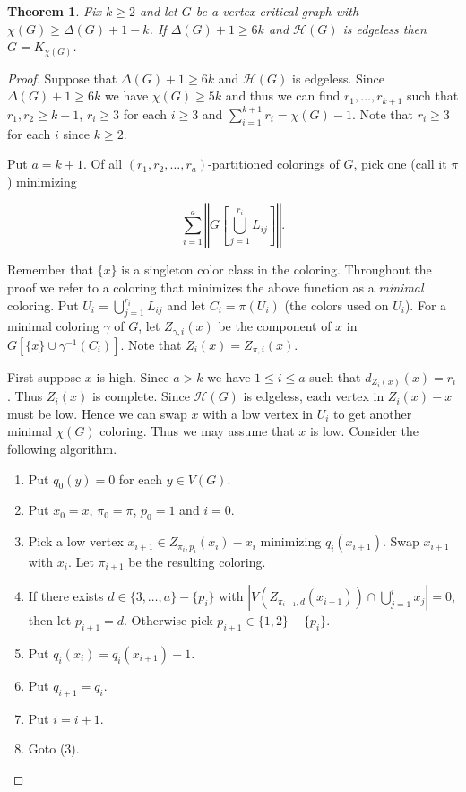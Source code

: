 \documentclass[12pt]{amsart}
\theoremstyle{plain}
\newtheorem{thm}{Theorem}
\theoremstyle{definition}
\theoremstyle{remark}
\newcommand{\size}[1]{\left\Vert#1\right\Vert}
\begin{document}
\begin{thm}\label{TheoremP}
Fix $k \geq 2$ and let $G$ be a vertex critical graph with $\chi(G) \geq \Delta(G) + 1 - k$.  If $\Delta(G) + 1 \geq 6k$ and $\mathcal{H}(G)$ is edgeless then $G = K_{\chi(G)}$.
\end{thm}
\begin{proof}
Suppose that $\Delta(G) + 1 \geq 6k$ and $\mathcal{H}(G)$ is edgeless. Since $\Delta(G) + 1 \geq 6k$ we have $\chi(G) \geq 5k$ and thus we can find $r_1, \ldots, r_{k+1}$ such that $r_1, r_2 \geq k + 1$, $r_i \geq 3$ for each $i \geq 3$ and $\sum_{i = 1}^{k+1} r_i = \chi(G) - 1$.  Note that $r_i \geq 3$ for each $i$ since $k \geq 2$.

Put $a = k+1$. Of all $(r_1, r_2, \ldots, r_a)$-partitioned colorings of $G$, pick one (call it $\pi$) minimizing

\[\sum_{i = 1}^a \size{G\left[\bigcup_{j = 1}^{r_i} L_{ij}\right]}.\]

Remember that $\{x\}$ is a singleton color class in the coloring. Throughout the proof we refer to a coloring that minimizes the above function as a \emph{minimal} coloring. Put $U_i = \bigcup_{j = 1}^{r_i} L_{ij}$ and let $C_i = \pi(U_i)$ (the colors used on $U_i$).  For a minimal coloring $\gamma$ of $G$, let $Z_{\gamma, i}(x)$ be the component of $x$ in $G[\{x\} \cup \gamma^{-1}(C_i)]$.  Note that $Z_i(x) = Z_{\pi, i}(x)$.

First suppose $x$ is high. Since $a > k$ we have $1 \leq i \leq a$ such that $d_{Z_i(x)}(x) = r_i$.  Thus $Z_i(x)$ is complete.  Since $\mathcal{H}(G)$ is edgeless, each vertex in $Z_i(x) - x$ must be low.  Hence we can swap $x$ with a low vertex in $U_i$ to get another minimal $\chi(G)$ coloring. Thus we may assume that $x$ is low.  Consider the following algorithm.
\begin{enumerate}
\item Put $q_0(y) = 0$ for each $y \in V(G)$.
\item Put $x_0 = x$, $\pi_0 = \pi$, $p_0 = 1$ and $i = 0$.
\item Pick a low vertex $x_{i + 1} \in Z_{\pi_i, p_i}(x_i) - x_i$ minimizing $q_i(x_{i + 1})$. Swap $x_{i + 1}$ with $x_i$. Let $\pi_{i+1}$ be the resulting coloring.
\item If  there exists $d \in  \{3, \ldots, a\} - \{p_i\}$ with $\left|V(Z_{\pi_{i + 1}, d}(x_{i + 1})) \cap \bigcup_{j = 1}^i x_j\right| = 0$, then let $p_{i+1} = d$.  Otherwise pick $p_{i+1} \in \{1,2\} - \{p_i\}$.
\item Put $q_i(x_i) = q_i(x_{i+1}) + 1$.
\item Put $q_{i+1} = q_i$.
\item Put $i = i + 1$.
\item Goto (3).
\end{enumerate}  


\end{proof}
\end{document}
